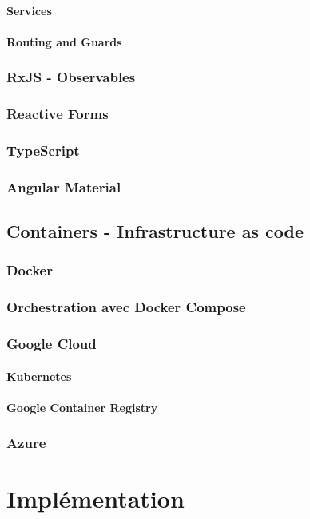 \documentclass[11pt,a4paper]{report}
\begin{document}
\subsubsection{Services}
\subsubsection{Routing and Guards}
\subsection{RxJS - Observables}
\subsection{Reactive Forms}
\subsection{TypeScript}
\subsection{Angular Material}

\section{Containers - Infrastructure as code}
\subsection{Docker}
\subsection{Orchestration avec Docker Compose}
\subsection{Google Cloud}
\subsubsection{Kubernetes}
\subsubsection{Google Container Registry}
\subsection{Azure}

\chapter{Implémentation}
\end{document}
